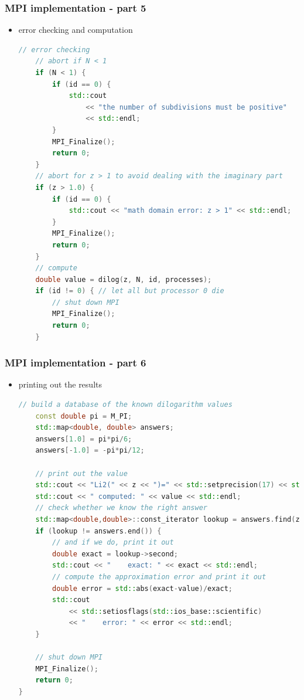 \begin{frame}[fragile]
%
  \frametitle{MPI implementation - part 5}
%
  \begin{itemize}
  \item error checking and computation
  \begin{lstlisting}[language=c++,name=mpi]
    // error checking
    // abort if N < 1
    if (N < 1) {
        if (id == 0) {
            std::cout 
                << "the number of subdivisions must be positive"
                << std::endl;
        }
        MPI_Finalize();
        return 0;
    }
    // abort for z > 1 to avoid dealing with the imaginary part
    if (z > 1.0) {
        if (id == 0) {
            std::cout << "math domain error: z > 1" << std::endl;
        }
        MPI_Finalize();
        return 0;
    } 
    // compute
    double value = dilog(z, N, id, processes);
    if (id != 0) { // let all but processor 0 die
        // shut down MPI
        MPI_Finalize();
        return 0;
    }
  \end{lstlisting}
%
  \end{itemize}
%
\end{frame}

\begin{frame}[fragile]
%
  \frametitle{MPI implementation - part 6}
%
  \begin{itemize}
  \item printing out the results
  \begin{lstlisting}[language=c++,name=mpi]
    // build a database of the known dilogarithm values
    const double pi = M_PI;
    std::map<double, double> answers;
    answers[1.0] = pi*pi/6;
    answers[-1.0] = -pi*pi/12;

    // print out the value
    std::cout << "Li2(" << z << ")=" << std::setprecision(17) << std::endl;
    std::cout << " computed: " << value << std::endl;
    // check whether we know the right answer
    std::map<double,double>::const_iterator lookup = answers.find(z);
    if (lookup != answers.end()) {
        // and if we do, print it out
        double exact = lookup->second;
        std::cout << "    exact: " << exact << std::endl;
        // compute the approximation error and print it out
        double error = std::abs(exact-value)/exact;
        std::cout 
            << std::setiosflags(std::ios_base::scientific) 
            << "    error: " << error << std::endl;
    }

    // shut down MPI
    MPI_Finalize();
    return 0;
}
  \end{lstlisting}
%
  \end{itemize}
%
\end{frame}

